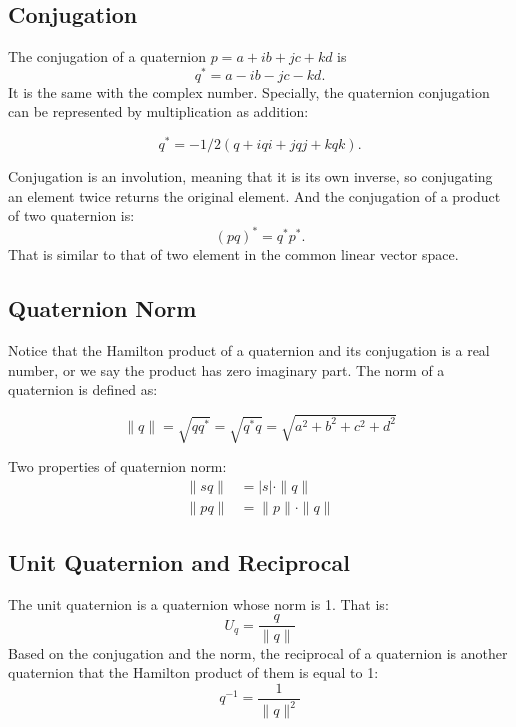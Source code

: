\documentclass{article}
\begin{document}
\subsection{Conjugation}

The conjugation of a quaternion $p=a+ib+jc+kd$ is 
\begin{equation}
  q^*=a-ib-jc-kd. 
\end{equation}
It is the same with the complex number. Specially, the quaternion conjugation can be represented by multiplication as addition:

\begin{equation}
  q^* = -1/2(q+iqi+jqj+kqk).
\end{equation}

Conjugation is an involution, meaning that it is its own inverse, so conjugating an element twice returns the original element. And the conjugation of a product of two quaternion is:
\begin{equation}
  (pq)^* = q^*p^*.
\end{equation}
That is similar to that of two element in the common linear vector space.

\subsection{Quaternion Norm}

Notice that the Hamilton product of a quaternion and its conjugation is a real number, or we say the product has zero imaginary part. The norm of a quaternion is defined as:

\begin{equation}
  \|q\| = \sqrt{qq^*} = \sqrt{q^*q} = \sqrt{a^2+b^2+c^2+d^2}
\end{equation}

Two properties of quaternion norm:
\begin{equation}
  \begin{split}
    \|sq\| &= |s| \cdot \|q\|   \\
    \|pq\| &= \|p\| \cdot \|q\|
  \end{split}
\end{equation}

\subsection{Unit Quaternion and Reciprocal}
The unit quaternion is a quaternion whose norm is 1. That is:
\begin{equation}
  U_q = \frac{q}{\|q\|}
\end{equation}
Based on the conjugation and the norm, the reciprocal of a quaternion is another quaternion that the Hamilton product of them is equal to 1:
\begin{equation}
  q^{-1} = \frac{1}{\|q\|^2}
\end{equation}
\end{document}
